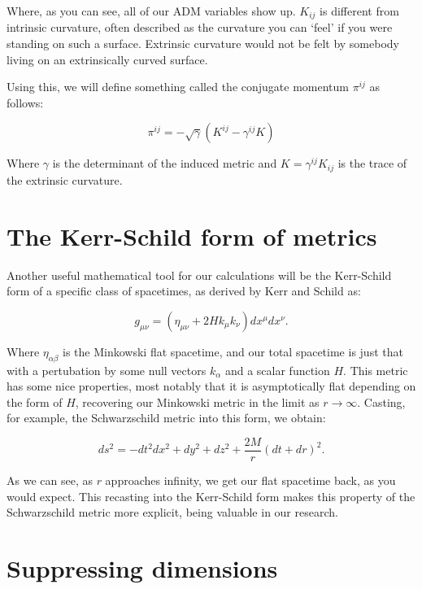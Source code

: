 \documentclass[twoside, openright]{RadboudReport}
\newcommand{\mn}{{\mu\nu}}
\newcommand{\ab}{{\alpha\beta}}
\begin{document}
Where, as you can see, all of our ADM variables show up. $K_{ij}$ is different from intrinsic curvature, often described as the curvature you can `feel' if you were standing on such a surface. Extrinsic curvature would not be felt by somebody living on an extrinsically curved surface.\newline

Using this, we will define something called the conjugate momentum $\pi^{ij}$ as follows:

\begin{equation}
	\pi^{ij} = -\sqrt{\gamma}(K^{ij} - \gamma^{ij}K)
\end{equation}

Where $\gamma$ is the determinant of the induced metric and $K = \gamma^{ij}K_{ij}$ is the trace of the extrinsic curvature.

\section{The Kerr-Schild form of metrics}

Another useful mathematical tool for our calculations will be the Kerr-Schild form of a specific class of spacetimes, as derived by Kerr and Schild \cite{Kerr2009-nk} as:

\begin{equation}
	g_\mn = (\eta_\mn + 2Hk_\mu k_\nu)dx^\mu dx^\nu.
	\label{eq:ksform}
\end{equation}

Where $\eta_\ab$ is the Minkowski flat spacetime, and our total spacetime is just that with a pertubation by some null vectors $k_\alpha$ and a scalar function $H$. This metric has some nice properties, most notably that it is asymptotically flat depending on the form of $H$, recovering our Minkowski metric in the limit as $r  \rightarrow \infty$. Casting, for example, the Schwarzschild metric into this form, we obtain:

\begin{equation}
	ds^2 = -dt^2 dx^2 + dy^2 + dz^2 +\frac{2M}{r}(dt+dr)^2.
\end{equation}

As we can see, as $r$ approaches infinity, we get our flat spacetime back, as you would expect. This recasting into the Kerr-Schild form makes this property of the Schwarzschild metric more explicit, being valuable in our research.


\section{Suppressing dimensions}
\end{document}
